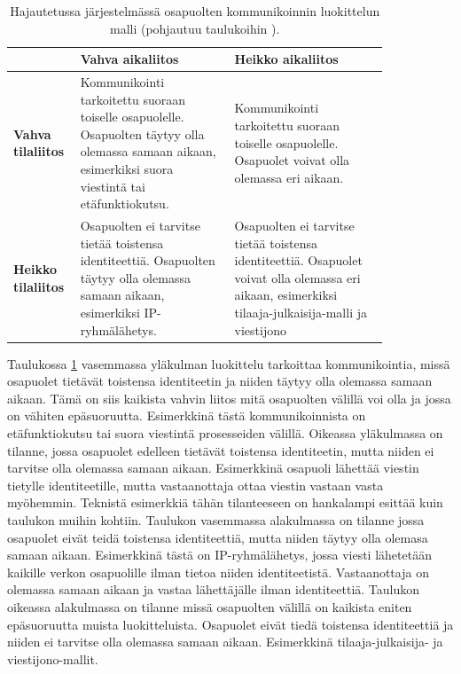 \begin{table}[ht!]
	\caption{Hajautetussa järjestelmässä osapuolten kommunikoinnin luokittelun malli (pohjautuu taulukoihin \mbox{\cite[s.~231]{distributed-systems-concepts-and-design}} \mbox{\cite[s.~84]{cabri2000mobile}}).}
	\label{tab:communication-models}
	\begin{tabular}{p{0.1\linewidth} | p{0.37\linewidth} | p{0.37\linewidth}}
		\hline
		& \textbf{Vahva aikaliitos} & \textbf{Heikko aikaliitos} \\
		\hline
		\textbf{Vahva tilaliitos} & Kommunikointi tarkoitettu suoraan toiselle osapuolelle. Osapuolten täytyy olla olemassa samaan aikaan, esimerkiksi suora viestintä tai etäfunktiokutsu. & Kommunikointi tarkoitettu suoraan toiselle osapuolelle. Osapuolet voivat olla olemassa eri aikaan.\\
		\hline
		\textbf{Heikko tilaliitos} & Osapuolten ei tarvitse tietää toistensa identiteettiä. Osapuolten täytyy olla olemassa samaan aikaan, esimerkiksi IP-ryhmälähetys. & Osapuolten ei tarvitse tietää toistensa identiteettiä. Osapuolet voivat olla olemassa eri aikaan, esimerkiksi tilaaja-julkaisija-malli ja viestijono \\
		\hline
	\end{tabular}
\end{table}

Taulukossa \ref{tab:communication-models} vasemmassa yläkulman luokittelu tarkoittaa kommunikointia, missä osapuolet tietävät toistensa identiteetin ja niiden täytyy olla olemassa samaan aikaan. Tämä on siis kaikista vahvin liitos mitä osapuolten välillä voi olla ja jossa on vähiten epäsuoruutta. Esimerkkinä tästä kommunikoinnista on etäfunktiokutsu tai suora viestintä prosesseiden välillä. Oikeassa yläkulmassa on tilanne, jossa osapuolet edelleen tietävät toistensa identiteetin, mutta niiden ei tarvitse olla olemassa samaan aikaan. Esimerkkinä osapuoli lähettää viestin tietylle identiteetille, mutta vastaanottaja ottaa viestin vastaan vasta myöhemmin. Teknistä esimerkkiä tähän tilanteeseen on hankalampi esittää kuin taulukon muihin kohtiin. Taulukon vasemmassa alakulmassa on tilanne jossa osapuolet eivät teidä toistensa identiteettiä, mutta niiden täytyy olla olemasa samaan aikaan. Esimerkkinä tästä on IP-ryhmälähetys, jossa viesti lähetetään kaikille verkon osapuolille ilman tietoa niiden identiteetistä. Vastaanottaja on olemassa samaan aikaan ja vastaa lähettäjälle ilman identiteettiä. Taulukon oikeassa alakulmassa on tilanne missä osapuolten välillä on kaikista eniten epäsuoruutta muista luokitteluista. Osapuolet eivät tiedä toistensa identiteettiä ja niiden ei tarvitse olla olemassa samaan aikaan. Esimerkkinä tilaaja-julkaisija- ja viestijono-mallit. \mbox{\cite[s.~230--232]{distributed-systems-concepts-and-design}} \mbox{\cite{cabri2000mobile}}

